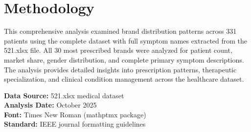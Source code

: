 \documentclass[10pt]{article}
\begin{document}
\section{Methodology}

This comprehensive analysis examined brand distribution patterns across 331 patients using the complete dataset with full symptom names extracted from the 521.xlsx file. All 30 most prescribed brands were analyzed for patient count, market share, gender distribution, and complete primary symptom descriptions. The analysis provides detailed insights into prescription patterns, therapeutic specialization, and clinical condition management across the healthcare dataset.

\textbf{Data Source:} 521.xlsx medical dataset\\
\textbf{Analysis Date:} October 2025\\
\textbf{Font:} Times New Roman (mathptmx package)\\
\textbf{Standard:} IEEE journal formatting guidelines
\end{document}
